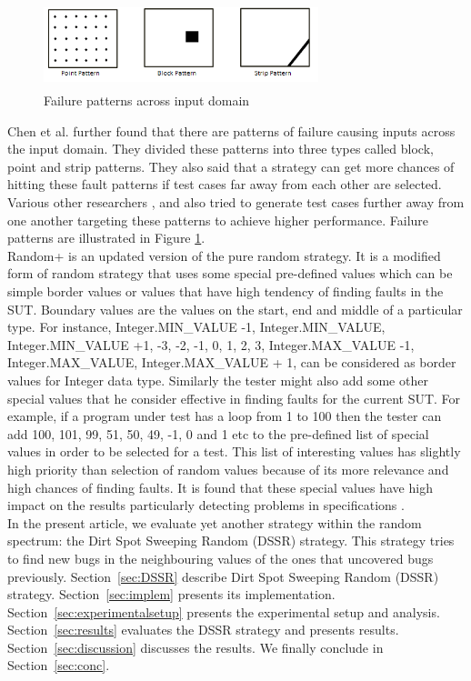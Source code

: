 \documentclass[10pt, conference, compsocconf]{IEEEtran}
\begin{document}
\begin{figure}[htp]
\centering
\includegraphics[width=8cm,height=2.5cm]{ART_Patterns.png}
\caption{Failure patterns across input domain \cite{Chen2006}}
\label{fig:patterns}
\end{figure}

Chen et al. \cite{Chen2008} further found that there are patterns of failure causing inputs across the input domain. They divided these patterns into three types called block, point and strip patterns. They also said that a strategy can get more chances of hitting these fault patterns if test cases far away from each other are selected. Various other researchers \cite{Chan2002}, \cite{Chen2003} and \cite{Chen2005} also tried to generate test cases further away from one another targeting these patterns to achieve higher performance. Failure patterns are illustrated in Figure \ref{fig:patterns}.\\


Random+ \cite{Leitner2007} is an updated version of the pure random strategy. It is a modified form of random strategy that uses some special pre-defined values which can be simple border values or values that have high tendency of finding faults in the SUT. Boundary values \cite{Beizer1990} are the values on the start, end and middle of a particular type. For instance,  Integer.MIN\_VALUE -1, Integer.MIN\_VALUE, Integer.MIN\_VALUE +1, -3, -2, -1, 0, 1, 2, 3, Integer.MAX\_VALUE -1, Integer.MAX\_VALUE, Integer.MAX\_VALUE + 1, can be considered as border values for Integer data type. Similarly the tester might also add some other special values that he consider effective in finding faults for the current SUT. For example, if a program under test has a loop from 1 to 100 then the tester can add 100, 101, 99, 51, 50, 49, -1, 0 and 1 etc to the pre-defined list of special values in order to be selected for a test. This list of interesting values has slightly high priority than selection of random values because of its more relevance and high chances of finding faults. It is found that these special values have high impact on the results particularly detecting problems in specifications \cite{Ciupa2008}.\\

In the present article, we evaluate yet another strategy within the random spectrum: the Dirt Spot Sweeping Random (DSSR) strategy. This strategy tries to find new bugs in the neighbouring values of the ones that uncovered bugs previously. Section~\ref{sec:DSSR} describe Dirt Spot Sweeping Random (DSSR) strategy. Section~\ref{sec:implem} presents its implementation. Section~\ref{sec:experimentalsetup} presents the experimental setup and analysis. Section~\ref{sec:results} evaluates the DSSR strategy and presents results. Section~\ref{sec:discussion} discusses the results. We finally conclude in Section~\ref{sec:conc}.\\ 
\end{document}
